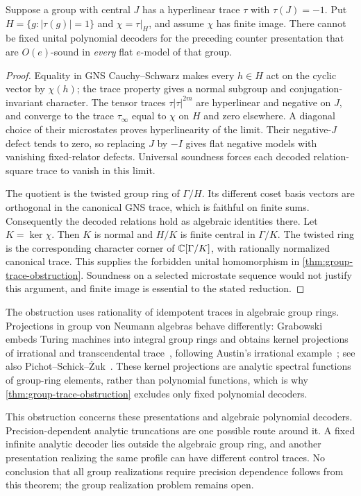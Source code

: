\begin{corollary}\label{cor:group-approx-obstruction}
Suppose a group with central $J$ has a hyperlinear trace $\tau$ with $\tau(J)=-1$. Put $H=\{g:|\tau(g)|=1\}$ and $\chi=\tau|_H$, and assume $\chi$ has finite image. There cannot be fixed unital polynomial decoders for the preceding counter presentation that are $O(e)$-sound in \emph{every} flat $e$-model of that group.
\end{corollary}
\begin{proof}
Equality in GNS Cauchy--Schwarz makes every $h\in H$ act on the cyclic vector by $\chi(h)$; the trace property gives a normal subgroup and conjugation-invariant character. The tensor traces $\tau|\tau|^{2m}$ are hyperlinear and negative on $J$, and converge to the trace $\tau_\infty$ equal to $\chi$ on $H$ and zero elsewhere. A diagonal choice of their microstates proves hyperlinearity of the limit. Their negative-$J$ defect tends to zero, so replacing $J$ by $-I$ gives flat negative models with vanishing fixed-relator defects. Universal soundness forces each decoded relation-square trace to vanish in this limit.

The quotient is the twisted group ring of $\Gamma/H$. Its different coset basis vectors are orthogonal in the canonical GNS trace, which is faithful on finite sums. Consequently the decoded relations hold as algebraic identities there. Let $K=\ker\chi$. Then $K$ is normal and $H/K$ is finite central in $\Gamma/K$. The twisted ring is the corresponding character corner of $\mathbb C[\Gamma/K]$, with rationally normalized canonical trace. This supplies the forbidden unital homomorphism in \cref{thm:group-trace-obstruction}. Soundness on a selected microstate sequence would not justify this argument, and finite image is essential to the stated reduction.
\end{proof}

The obstruction uses rationality of idempotent traces in algebraic group rings. Projections in group von Neumann algebras behave differently: Grabowski embeds Turing machines into integral group rings and obtains kernel projections of irrational and transcendental trace~\cite{Gra14}, following Austin's irrational example~\cite{Aus13}; see also Pichot--Schick--\.{Z}uk~\cite{PSZ15}. These kernel projections are analytic spectral functions of group-ring elements, rather than polynomial functions, which is why \cref{thm:group-trace-obstruction} excludes only fixed polynomial decoders.

This obstruction concerns these presentations and algebraic polynomial decoders. Precision-dependent analytic truncations are one possible route around it. A fixed infinite analytic decoder lies outside the algebraic group ring, and another presentation realizing the same profile can have different control traces. No conclusion that all group realizations require precision dependence follows from this theorem; the group realization problem remains open.
